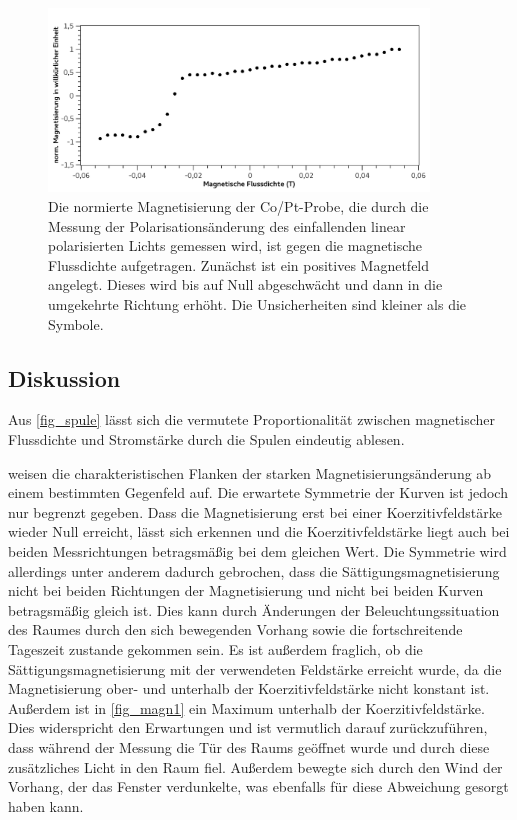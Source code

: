 \documentclass[
	a4paper,
	12pt,
	pagesize,
	ngerman
]{scrartcl}
\begin{document}
	\begin{figure}[H] %
		\includegraphics[width=0.90\textwidth]{fig_magn2}
		\centering
		\caption{Die normierte Magnetisierung der Co/Pt-Probe, die durch die Messung der Polarisationsänderung des einfallenden linear polarisierten Lichts gemessen wird, ist gegen die magnetische Flussdichte aufgetragen. 
		Zunächst ist ein positives Magnetfeld angelegt. 
		Dieses wird bis auf Null abgeschwächt und dann in die umgekehrte Richtung erhöht.
		Die Unsicherheiten sind kleiner als die Symbole.} 
		\label{fig_magn2}
		\centering
	\end{figure}
	\subsection{Diskussion}

	Aus \cref{fig_spule} lässt sich die vermutete Proportionalität zwischen magnetischer Flussdichte und Stromstärke durch die Spulen eindeutig ablesen.
	
	 weisen die charakteristischen Flanken der starken Magnetisierungsänderung ab einem bestimmten Gegenfeld auf.
	Die erwartete Symmetrie der Kurven ist jedoch nur begrenzt gegeben.
	Dass die Magnetisierung erst bei einer Koerzitivfeldstärke wieder Null erreicht, lässt sich erkennen und die Koerzitivfeldstärke liegt auch bei beiden Messrichtungen betragsmäßig bei dem gleichen Wert.
	Die Symmetrie wird allerdings unter anderem dadurch gebrochen, dass die Sättigungsmagnetisierung nicht bei beiden Richtungen der Magnetisierung und nicht bei beiden Kurven betragsmäßig gleich ist.
	Dies kann durch Änderungen der Beleuchtungssituation des Raumes durch den sich bewegenden Vorhang sowie die fortschreitende Tageszeit zustande gekommen sein.
	Es ist außerdem fraglich, ob die Sättigungsmagnetisierung mit der verwendeten Feldstärke erreicht wurde, da die Magnetisierung ober- und unterhalb der Koerzitivfeldstärke nicht konstant ist.
	Außerdem ist in \cref{fig_magn1} ein Maximum unterhalb der Koerzitivfeldstärke.
	Dies widerspricht den Erwartungen und ist vermutlich darauf zurückzuführen, dass während der Messung die Tür des Raums geöffnet wurde und durch diese zusätzliches Licht in den Raum fiel.
	Außerdem bewegte sich durch den Wind der Vorhang, der das Fenster verdunkelte, was ebenfalls für diese Abweichung gesorgt haben kann.
	
\end{document}
